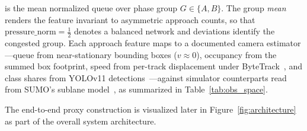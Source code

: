 is the mean normalized queue over phase group $G \in \{A, B\}$. The group \emph{mean}
renders the feature invariant to asymmetric approach counts, so that
$\mathrm{pressure\_norm} = \tfrac{1}{2}$ denotes a balanced network and deviations
identify the congested group. Each approach feature maps to a documented camera
estimator---queue from near-stationary bounding boxes ($v\approx 0$), occupancy from the summed box footprint, speed from per-track displacement under ByteTrack~\cite{zhang2022_bytetrack}, and class shares
from YOLOv11 detections~\cite{khanam2024_yolov11, ultralytics_yolo11}---against
simulator counterparts read from SUMO's sublane model~\cite{lopez2018_sumo}, as
summarized in Table~\ref{tab:obs_space}.
\begin{table}[htbp]
  \centering
  \caption{26-Dimensional Local Proxy Observation Space ($\mathcal{O}_i$). Each
  approach feature occupies index $5k{+}j$ for approach $k\in\{0,1,2,3\}$ and
  feature $j$; the four approaches fill indices $0$--$19$.}
  \label{tab:obs_space}
  \vspace{-4mm}
\end{table}
The end-to-end proxy construction is visualized later in Figure~\ref{fig:architecture} as
part of the overall system architecture.

